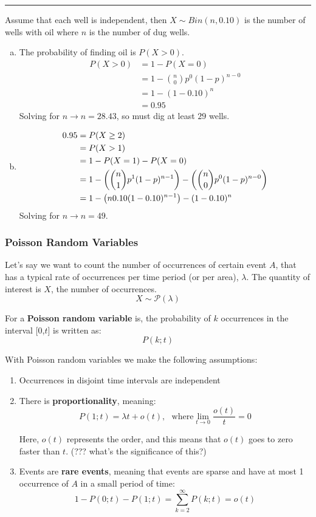 \documentclass{report}
\newcommand{\ex}{\noindent\rule{\linewidth}{0.2pt}}
\DeclarePairedDelimiter\autobracket{(}{)}
\newcommand{\br}[1]{\autobracket*{#1}}
\begin{document}
\ex

Assume that each well is independent, then $ X \sim Bin(n, 0.10)$ is the number of wells with oil where $n$ is the number of dug wells.
\begin{enumerate}[(a)]
\item The probability of finding oil is $P(X > 0)$. 
\begin{align*}P(X > 0) & = 1 - P(X = 0) \\
& = 1 - {n \choose 0} p^0 (1-p)^{n-0} \\
& = 1 - (1 - 0.10)^n \\
& = 0.95 
\end{align*}
Solving for $n \rightarrow n = 28.43$, so must dig at least $\boxed{29}$ wells.

\item \begin{align*}
0.95 & = P(X \geq 2) \\
& = P(X > 1) \\
& = 1 - P(X = 1) - P(X = 0) \\
& = 1 - \br{{n \choose 1} p^1 (1-p)^{n-1}} - \br{{n \choose 0} p^0 (1-p)^{n-0}}  \\
& = 1 -  \br{n 0.10 (1-0.10)^{n-1}} - (1-0.10)^{n}
\end{align*}
Solving for $n \rightarrow \boxed{n = 49}$.

\end{enumerate}


\subsubsection{Poisson Random Variables}

Let's say we want to count the number of occurrences of  certain event $A$, that has a typical rate of occurrences per time period (or per area), $\lambda$. The quantity of interest is $X$, the number of occurrences.
$$X \sim \mathcal{P}(\lambda)$$

For a \textbf{Poisson random variable} is, the probability of $k$ occurrences in the interval [0,$t$] is written as: $$P(k; t)$$ 

With Poisson random variables we make the following assumptions: \begin{enumerate}
\item Occurrences in disjoint time intervals are independent
\item There is \textbf{proportionality}, meaning: $$P(1;t) = \lambda t + o(t), \ \ \ \text{where} \lim_{t\rightarrow0} \frac{o(t)}{t} = 0$$

Here, $o(t)$ represents the order, and this means that $o(t)$ goes to zero faster than $t$.  (??? what's the significance of this?)

\item Events are \textbf{rare events}, meaning that events are sparse and have at most 1 occurrence of $A$ in a  small period of time: $$1-P(0;t) - P(1;t) = \sum_{k=2}^{\infty} P(k;t) = o(t)$$
\end{enumerate}
\end{document}
